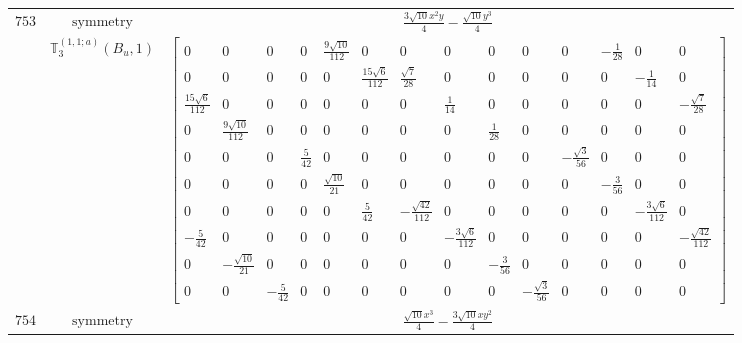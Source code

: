 \documentclass[fleqn,8pt,landscape]{jsarticle}
\begin{document}
\begin{longtable}{ccc}
$ 753 $ & $ \text{symmetry} $ & $ \frac{3 \sqrt{10} x^{2} y}{4} - \frac{\sqrt{10} y^{3}}{4} $ \\
$  $ & $ \mathbb{T}_{3}^{(1,1;a)}(B_{u},1) $ & $ \begin{bmatrix} 0 & 0 & 0 & 0 & \frac{9 \sqrt{10}}{112} & 0 & 0 & 0 & 0 & 0 & 0 & - \frac{1}{28} & 0 & 0 \\ 0 & 0 & 0 & 0 & 0 & \frac{15 \sqrt{6}}{112} & \frac{\sqrt{7}}{28} & 0 & 0 & 0 & 0 & 0 & - \frac{1}{14} & 0 \\ \frac{15 \sqrt{6}}{112} & 0 & 0 & 0 & 0 & 0 & 0 & \frac{1}{14} & 0 & 0 & 0 & 0 & 0 & - \frac{\sqrt{7}}{28} \\ 0 & \frac{9 \sqrt{10}}{112} & 0 & 0 & 0 & 0 & 0 & 0 & \frac{1}{28} & 0 & 0 & 0 & 0 & 0 \\ 0 & 0 & 0 & \frac{5}{42} & 0 & 0 & 0 & 0 & 0 & 0 & - \frac{\sqrt{3}}{56} & 0 & 0 & 0 \\ 0 & 0 & 0 & 0 & \frac{\sqrt{10}}{21} & 0 & 0 & 0 & 0 & 0 & 0 & - \frac{3}{56} & 0 & 0 \\ 0 & 0 & 0 & 0 & 0 & \frac{5}{42} & - \frac{\sqrt{42}}{112} & 0 & 0 & 0 & 0 & 0 & - \frac{3 \sqrt{6}}{112} & 0 \\ - \frac{5}{42} & 0 & 0 & 0 & 0 & 0 & 0 & - \frac{3 \sqrt{6}}{112} & 0 & 0 & 0 & 0 & 0 & - \frac{\sqrt{42}}{112} \\ 0 & - \frac{\sqrt{10}}{21} & 0 & 0 & 0 & 0 & 0 & 0 & - \frac{3}{56} & 0 & 0 & 0 & 0 & 0 \\ 0 & 0 & - \frac{5}{42} & 0 & 0 & 0 & 0 & 0 & 0 & - \frac{\sqrt{3}}{56} & 0 & 0 & 0 & 0 \end{bmatrix} $ \\ \hline
$ 754 $ & $ \text{symmetry} $ & $ \frac{\sqrt{10} x^{3}}{4} - \frac{3 \sqrt{10} x y^{2}}{4} $ \\

\end{longtable}
\end{document}
